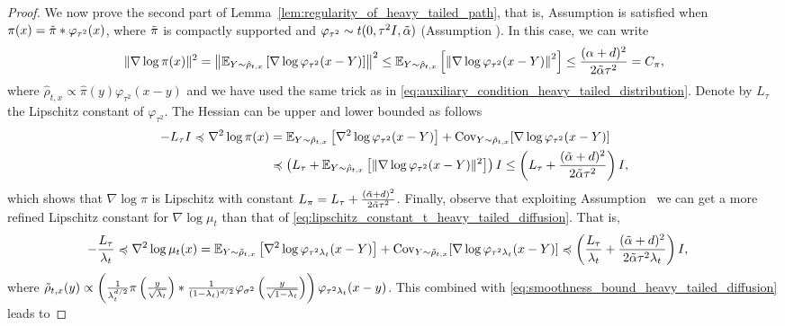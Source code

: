 \begin{proof}
We now prove the second part of Lemma~\ref{lem:regularity_of_heavy_tailed_path}, that is, Assumption  is satisfied when  $\pi(x) = \Tilde{\pi} * \varphi_{\tau^2}(x)$, where $\Tilde{\pi}$ is compactly supported and $\varphi_{\tau^2}\sim t(0, \tau^2 I, \Tilde{\alpha})$ (Assumption ). In this case, we can write
\begin{equation*}
    \Vert\nabla\log\pi(x)\Vert^2 = \left \Vert\mathbb{E}_{Y\sim\hat{\rho}_{t, x}} \left[\nabla\log\varphi_{\tau^2}(x-Y)\right]\right\Vert^2 \leq \mathbb{E}_{Y\sim\hat{\rho}_{t, x}} \left[\left \Vert\nabla\log\varphi_{\tau^2}(x-Y)\right\Vert^2\right] \leq \frac{(\alpha + d)^2}{2\Tilde{\alpha}\tau^2} = C_\pi,
\end{equation*}
where $\hat{\rho}_{t, x}\propto \hat{\pi}(y)\varphi_{\tau^2}(x-y)$ and we have used the same trick as in \eqref{eq:auxiliary_condition_heavy_tailed_distribution}. Denote by $L_\tau$ the Lipschitz constant of $\varphi_{\tau^2}$. The Hessian can be upper and lower bounded as follows
\begin{align*}
    -L_\tau I\preccurlyeq \nabla^2\log\pi(x) &= \mathbb{E}_{Y\sim\hat{\rho}_{t,x}} \left[\nabla^2\log\varphi_{\tau^2}(x-Y)\right] + \text{Cov}_{Y\sim\Hat{\rho}_{t,x}}[\nabla\log\varphi_{\tau^2}(x-Y)]\\
    & \preccurlyeq \left(L_\tau + \mathbb{E}_{Y\sim\hat{\rho}_{t,x}}\left[\Vert\nabla\log\varphi_{\tau^2}(x-Y)\Vert^2 \right] \right)I \leq \left(L_{\tau} + \frac{(\Tilde{\alpha} + d)^2}{2\Tilde{\alpha}\tau^2}\right) I,
\end{align*}
which shows that $\nabla\log\pi$ is Lipschitz with constant $L_\pi = L_{\tau} + \frac{(\Tilde{\alpha} + d)^2}{2\Tilde{\alpha}\tau^2}$.
Finally, observe that exploiting Assumption~ we can get a more refined Lipschitz constant for $\nabla\log\mu_t$ than that of \eqref{eq:lipschitz_constant_t_heavy_tailed_diffusion}. That is,
\begin{align*}
    -\frac{L_\tau}{\lambda_t}\preccurlyeq \nabla^2\log\mu_t(x) &= \mathbb{E}_{Y\sim \Tilde{\rho}_{t, x}} \left[\nabla^2 \log \varphi_{\tau^2\lambda_t}(x - Y)\right] + \text{Cov}_{Y\sim \Tilde{\rho}_{t, x}} [\nabla \log\varphi_{\tau^2 \lambda_t }(x- Y)]\preccurlyeq\left(\frac{L_\tau}{\lambda_t}+ \frac{(\Tilde{\alpha} + d)^2}{2\Tilde{\alpha}\tau^2\lambda_t}\right) I,
\end{align*}
where $\Tilde{\rho}_{t, x} (y) \propto \left(\frac{1}{\lambda_t^{d/2}} \pi\left(\frac{y}{\sqrt{\lambda_t}}\right) *\frac{1}{(1-\lambda_t)^{d/2}}\varphi_{\sigma^2}\left(\frac{y}{\sqrt{1-\lambda_t}}\right)\right)\varphi_{\tau^2\lambda_t}(x-y)$. This combined with \eqref{eq:smoothness_bound_heavy_tailed_diffusion} leads to

\end{proof}
